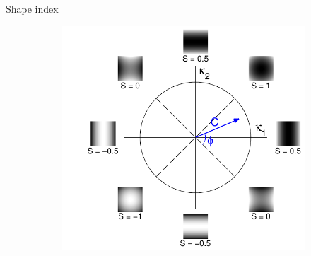 \documentclass[14pt,t]{beamer}
\begin{document}
%
\begin{frame}{Shape index}
\begin{figure}
\centering
	\begin{subfigure}[t]{0.75\textwidth}
		\includegraphics[width=\textwidth]{../report/img/shapeIndexTheory.pdf}
	\end{subfigure}
\end{figure}
\end{frame}
%
\end{document}

